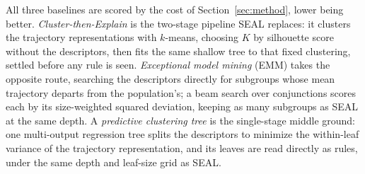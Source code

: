 \documentclass[runningheads]{llncs}
\begin{document}
All three baselines are scored by the cost of Section~\ref{sec:method}, lower being better. \emph{Cluster-then-Explain} is the two-stage pipeline \textsc{SEAL} replaces: it clusters the trajectory representations with $k$-means, choosing $K$ by silhouette score \citep{rousseeuw1987silhouettes} without the descriptors, then fits the same shallow tree to that fixed clustering, settled before any rule is seen. \emph{Exceptional model mining} (EMM) \citep{leman2008emm,duivesteijn2016emm} takes the opposite route, searching the descriptors directly for subgroups whose mean trajectory departs from the population's; a beam search over conjunctions scores each by its size-weighted squared deviation, keeping as many subgroups as \textsc{SEAL} at the same depth. A \emph{predictive clustering tree} \citep{blockeel1998clustering,zenko2006predictive} is the single-stage middle ground: one multi-output regression tree splits the descriptors to minimize the within-leaf variance of the trajectory representation, and its leaves are read directly as rules, under the same depth and leaf-size grid as \textsc{SEAL}.
\end{document}
